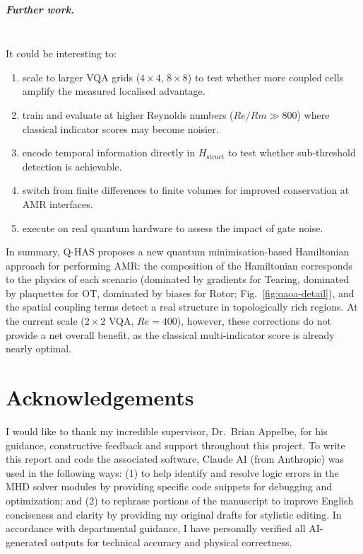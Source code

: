 \documentclass[12pt, a4paper, oneside]{report}
\begin{document}
\paragraph{Further work.}\phantom\\

\noindent It could be interesting to:
\begin{enumerate}
    \item scale to larger VQA grids ($4\times 4$, $8\times 8$) to test whether more coupled cells amplify the measured localised advantage.
    \item train and evaluate at higher Reynolds numbers ($Re/Rm \gg 800$) where classical indicator scores may become noisier. \item encode temporal information directly in $H_{\text{struct}}$ to test whether sub-threshold detection is achievable.
    \item switch from finite differences to finite volumes for improved conservation at AMR interfaces.
    \item execute on real quantum hardware to assess the impact of gate noise.
\end{enumerate}

\noindent In summary, Q-HAS proposes a new quantum minimisation-based Hamiltonian approach for performing AMR: the composition of the Hamiltonian corresponds to the physics of each scenario (dominated by gradients for Tearing, dominated by plaquettes for OT, dominated by biases for Rotor; Fig.~\ref{fig:qaoa-detail}), and the spatial coupling terms detect a real structure in topologically rich regions.  At the current scale ($2\times 2$ VQA, $Re = 400$), however, these corrections do not provide a net overall benefit, as the classical multi-indicator score is already nearly optimal.

\chapter*{Acknowledgements}

I would like to thank my incredible supervisor, Dr.\ Brian Appelbe, for his guidance, constructive feedback and support throughout this project. To write this report and code the associated software, Claude AI (from Anthropic) was used in the following ways: (1) to help identify and resolve logic errors in the MHD solver modules by providing specific code snippets for debugging and optimization; and (2) to rephrase portions of the manuscript to improve English conciseness and clarity by providing my original drafts for stylistic editing. In accordance with departmental guidance, I have personally verified all AI-generated outputs for technical accuracy and physical correctness.
\end{document}
